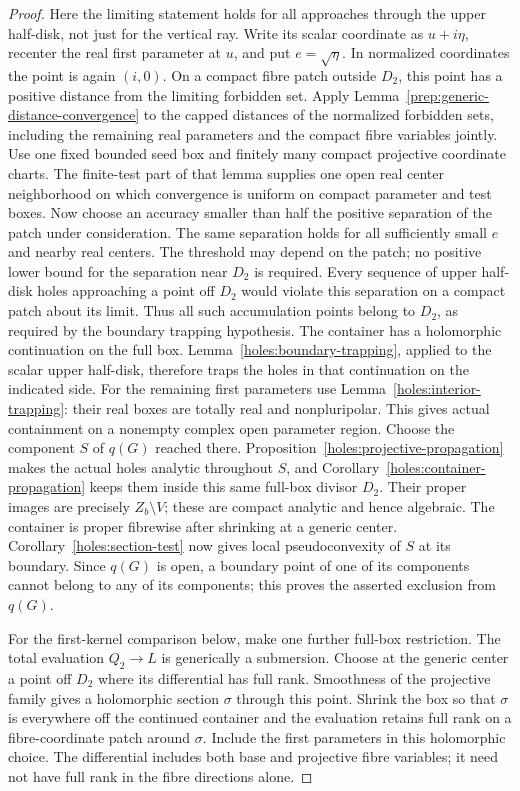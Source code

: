 \begin{proof}
Here the limiting statement holds for all approaches through the
upper half-disk, not just for the vertical ray.  Write its scalar
coordinate as $u+i\eta$, recenter the real first parameter at $u$,
and put $e=\sqrt\eta$.  In normalized coordinates the point is
again $(i,0)$.  On a compact fibre patch outside $D_2$, this point
has a positive distance from the limiting forbidden set.  Apply
Lemma~\ref{prep:generic-distance-convergence} to the capped distances
of the normalized forbidden sets, including the remaining real
parameters and the compact fibre variables jointly.  Use one fixed
bounded seed box and finitely many compact projective coordinate
charts.  The finite-test part of that lemma supplies one open real
center neighborhood on which convergence is uniform on compact
parameter and test boxes.  Now choose an accuracy smaller than half
the positive separation of the patch under consideration.  The
same separation holds for all sufficiently small $e$ and nearby
real centers.  The threshold may depend on the patch; no positive
lower bound for the separation near $D_2$ is required.  Every sequence of upper
half-disk holes approaching a point off $D_2$ would violate this
separation on a compact patch about its limit.  Thus all such
accumulation points belong to $D_2$, as required by the boundary
trapping hypothesis.  The container has a holomorphic continuation
on the full box.
Lemma~\ref{holes:boundary-trapping}, applied to the scalar upper
half-disk, therefore traps the holes in that continuation on the
indicated side.  For the remaining first parameters use
Lemma~\ref{holes:interior-trapping}: their real boxes are totally
real and nonpluripolar.  This gives actual containment on a nonempty
complex open parameter region.  Choose the component $S$ of $q(G)$
reached there.  Proposition~\ref{holes:projective-propagation} makes
the actual holes analytic throughout $S$, and
Corollary~\ref{holes:container-propagation} keeps them inside this
same full-box divisor $D_2$.
Their proper images are precisely $Z_b\setminus V$;
these are compact analytic and hence algebraic.  The container is
proper fibrewise after shrinking at a generic center.
Corollary~\ref{holes:section-test} now gives local pseudoconvexity of $S$
at its boundary.  Since $q(G)$ is open, a boundary point of one of
its components cannot belong to any of its components; this proves
the asserted exclusion from $q(G)$.

For the first-kernel comparison below, make one further full-box
restriction.  The total evaluation $Q_2\to L$ is generically a
submersion.  Choose at the generic center a point off $D_2$ where
its differential has full rank.  Smoothness of the projective
family gives a holomorphic section $\sigma$ through this point.
Shrink the box so that $\sigma$ is everywhere off the continued
container and the evaluation retains full rank on a fibre-coordinate
patch around $\sigma$.  Include the first parameters in this
holomorphic choice.  The differential includes both base and
projective fibre variables; it need not have full rank in the
fibre directions alone.


\end{proof}
